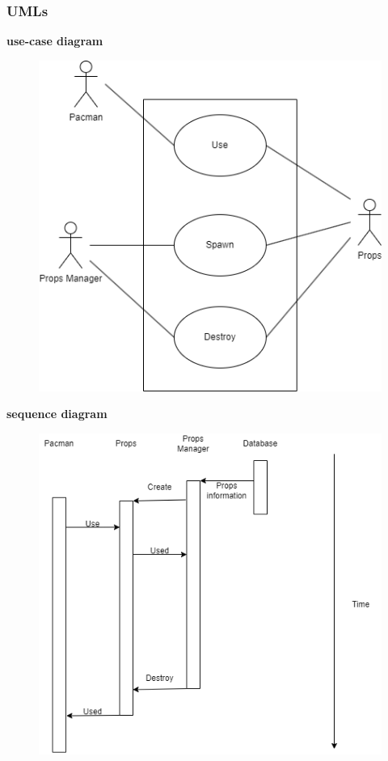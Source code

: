 \documentclass[11pt]{article}
\begin{document}
\subsubsection{UMLs}
\textbf{use-case diagram}\\
\begin{figure}[H]
    \centering
    \includegraphics*[scale=0.4]{Props_use-case.png}
\end{figure}
\textbf{sequence diagram}\\
\begin{figure}[H]
    \centering
    \includegraphics*[scale=0.4]{Props_sequence.png}
\end{figure}
\end{document}
